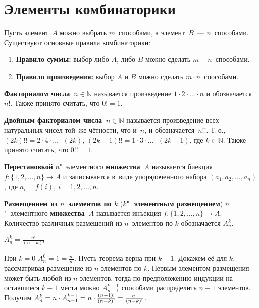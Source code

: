 \section{Элементы комбинаторики}
Пусть элемент~$A$ можно выбрать $m$~способами, а элемент~$B$~--- $n$~способами. Существуют основные правила комбинаторики:
\begin{enumerate}
	\item \textbf{Правило суммы:} выбор либо $A$, либо $B$ можно сделать $m + n$~способами.
	\item \textbf{Правило произведения:} выбор $A$ и $B$ можно сделать $m \cdot n$~способами.
\end{enumerate}

\index{!}  \textbf{Факториалом числа~$n \in \mathbb N$} называется произведение $1 \cdot 2 \cdot \ldots \cdot n$ и обозначается~$n!$.
Также принято считать, что $0! = 1$.

\textbf{Двойным факториалом числа~$n \in \mathbb N$} называется произведение всех натуральных чисел той~же чётности, что и~$n$, и обозначается~$n!!$.
Т.\,о., $(2k)!! = 2 \cdot 4 \cdot \ldots \cdot (2k)$, $(2k - 1)!! = 1 \cdot 3 \cdot \ldots \cdot (2k - 1)$, где $k \in \mathbb N$.
Также принято считать, что $0!! = 1$.

 \textbf{Перестановкой} $n$"~элементного \textbf{множества~$A$} называется биекция $f \colon \{ 1, 2, \ldots, n \} \to A$ и записывается в~виде упорядоченного набора $(a_1, a_2, \ldots, a_n)$, где $a_i = f(i), \ i = 1, 2, \ldots, n$.

 \textbf{Размещением из $n$~элементов по $k$} (\textbf{$k$"~элементным размещением}) $n$"~элементного \textbf{множества~$A$} называется инъекция $f \colon \{ 1, 2, \ldots, n \} \to A$.
Количество различных размещений из $n$~элементов по $k$ обозначается $A_n^k$.

\begin{statement}
$A_n^k = \frac{n!}{(n - k)!}$
\end{statement}
\begin{proofmathind}
	\indbase При $k = 0$ $A_n^0 = 1 = \frac{n!}{n!}$.
	\indstep Пусть теорема верна при $k - 1$.
	Докажем её для $k$, рассматривая размещение из $n$ элементов по $k$.
	Первым элементом размещения может быть любой из $n$ элементов, тогда по предположению индукции на оставшиеся $k - 1$ места можно $A_{n-1}^{k-1}$ способами распределить $n - 1$ элементов.
	Получим $A_n^k \opbr= n \cdot A_{n-1}^{k-1} \opbr= n \cdot \frac{(n - 1)!}{(n - k)!} \opbr= \frac{n!}{(n - k)!}$. \indend
\end{proofmathind}

